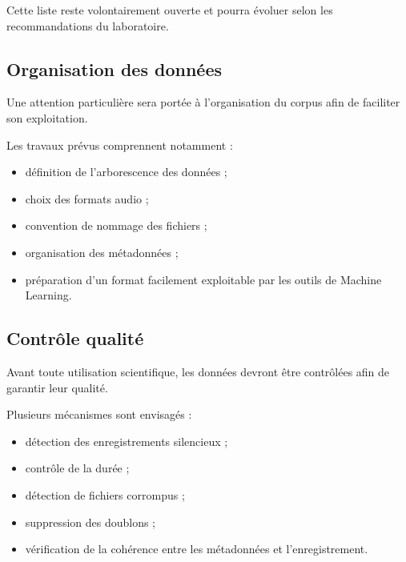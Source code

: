 Cette liste reste volontairement ouverte et pourra évoluer selon les
recommandations du laboratoire.


\subsection{Organisation des données}

Une attention particulière sera portée à l'organisation du corpus afin
de faciliter son exploitation.

Les travaux prévus comprennent notamment :

\begin{itemize}

\item définition de l'arborescence des données ;

\item choix des formats audio ;

\item convention de nommage des fichiers ;

\item organisation des métadonnées ;

\item préparation d'un format facilement exploitable par les outils de
Machine Learning.

\end{itemize}


\subsection{Contrôle qualité}

Avant toute utilisation scientifique, les données devront être
contrôlées afin de garantir leur qualité.

Plusieurs mécanismes sont envisagés :

\begin{itemize}

\item détection des enregistrements silencieux ;

\item contrôle de la durée ;

\item détection de fichiers corrompus ;

\item suppression des doublons ;

\item vérification de la cohérence entre les métadonnées et
l'enregistrement.

\end{itemize}

